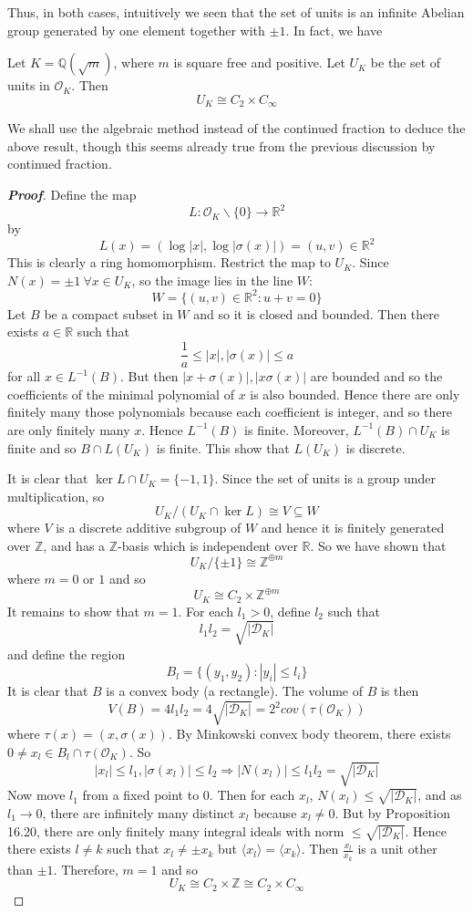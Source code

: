Thus, in both cases, intuitively we seen that the set of units is an infinite Abelian group generated by one element together with $\pm 1$.
In fact, we have


\begin{theorem} Let $K=\mathbb{Q}(\sqrt{m})$, where $m$ is square free and positive. Let $U_K$ be the set of units in $\mathcal{O}_K$.
Then
$$U_K \cong C_2 \times C_\infty$$
\end{theorem}
We shall use the algebraic method instead of the continued fraction to deduce the above result, though this seems already true from the previous discussion by continued fraction.
\begin{proof}[\bf Proof] Define the map
$$L:\mathcal{O}_K \backslash \{0\} \rightarrow \mathbb{R}^2$$
by
$$L(x)=(\log{|x|},\log{|\sigma(x)|})=(u,v) \in \mathbb{R}^2$$
This is clearly a ring homomorphism. Restrict the map to $U_K$.
Since $N(x)=\pm 1~\forall x\in U_K$, so the image lies in the line $W$:
$$W=\{(u,v) \in \mathbb{R}^2: u+v=0\}$$
Let $B$ be a compact subset in $W$ and so it is closed and bounded. Then there exists $a \in \mathbb{R}$ such that
$$\frac{1}{a} \le |x|,|\sigma(x)| \le a$$
for all $x \in L^{-1}(B)$.
But then $|x+\sigma(x)|,|x\sigma(x)|$ are bounded and so the coefficients of the minimal polynomial of $x$
is also bounded. Hence there are only finitely many those polynomials because each coefficient is integer,
and so there are only finitely many $x$. Hence $L^{-1}(B)$ is finite. Moreover, $L^{-1}(B) \cap U_K$ is finite and
so $B \cap L(U_K)$ is finite. This show that $L(U_K)$ is discrete.

It is clear that $\ker{L} \cap U_K=\{-1,1\}$. Since the set of units
is a group under multiplication, so
$$U_K/(U_K \cap \ker{L}) \cong V \subseteq W$$
where $V$ is a discrete additive subgroup of $W$ and hence it is finitely generated over $\mathbb{Z}$,
and has a $\mathbb{Z}$-basis which is independent over $\mathbb{R}$. So we have shown that
$$U_K/\{\pm 1\} \cong \mathbb{Z}^{\oplus m}$$
where $m=0$ or $1$ and so
$$U_K \cong C_2 \times \mathbb{Z}^{\oplus m}$$
It remains to show that $m=1$.
For each $l_1 >0$, define $l_2$ such that
$$l_1 l_2=\sqrt{|\mathcal{D}_K|}$$
and define the region
$$B_l=\{(y_1,y_2): |y_i| \le l_i\}$$
It is clear that $B$ is a convex body (a rectangle). The volume of $B$ is then
$$V(B)=4l_1l_2=4\sqrt{|\mathcal{D}_K|}=2^2 cov(\tau(\mathcal{O}_K))$$
where $\tau(x)=(x,\sigma(x))$.
By Minkowski convex body theorem, there exists $0 \neq x_l \in B_l \cap \tau(\mathcal{O}_K)$.
So
$$|x_l| \le l_1,|\sigma(x_l)| \le l_2 \Rightarrow |N(x_l)| \le l_1l_2=\sqrt{|\mathcal{D}_K|}$$
Now move $l_1$ from a fixed point to $0$. Then for each $x_l$, $N(x_l) \le \sqrt{|\mathcal{D}_K|}$, and
as $l_1 \to 0$, there are infinitely many distinct $x_l$ because $x_l \neq 0$. But by Proposition 16.20, there
are only finitely many integral ideals with norm $\le \sqrt{|\mathcal{D}_K|}$. Hence there exists $l \neq k$ such
that $x_l \neq \pm x_k$ but $\langle x_l \rangle=\langle x_k \rangle$.
Then $\frac{x_l}{x_k}$ is a unit other than $\pm 1$. Therefore, $m=1$ and so
$$U_K \cong C_2 \times \mathbb{Z} \cong C_2 \times C_\infty$$
\end{proof}
